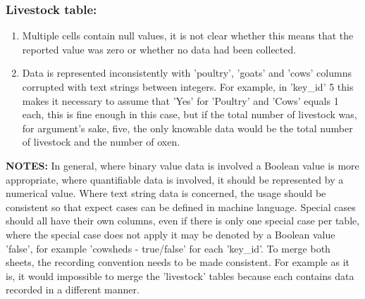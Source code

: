 \documentclass{article}
\begin{document}
\begin{enumerate}
    \subsubsection{Livestock table:}
    \begin{enumerate}
        \item Multiple cells contain null values, it is not clear whether this means that the reported value was zero or whether no data had been collected.
        \item Data is represented inconsistently with 'poultry', 'goats' and 'cows' columns corrupted with text strings between integers. For example, in 'key\_id' 5 this makes it necessary to assume that 'Yes' for 'Poultry' and 'Cows' equals 1 each, this is fine enough in this case, but if the total number of livestock was, for argument's sake, five, the only knowable data would be the total number of livestock and the number of oxen.
    \end{enumerate}
    \textbf{NOTES:} In general, where binary value data is involved a Boolean value is more appropriate, where quantifiable data is involved, it should be represented by a numerical value. Where text string data is concerned, the usage should be consistent so that expect cases can be defined in machine language. Special cases should all have their own columns, even if there is only one special case per table, where the special case does not apply it may be denoted by a Boolean value 'false', for example 'cowsheds - true/false' for each 'key\_id'. To merge both sheets, the recording convention needs to be made consistent. For example as it is, it would impossible to merge the 'livestock' tables because each contains data recorded in a different manner.
\end{enumerate}
\end{document}

